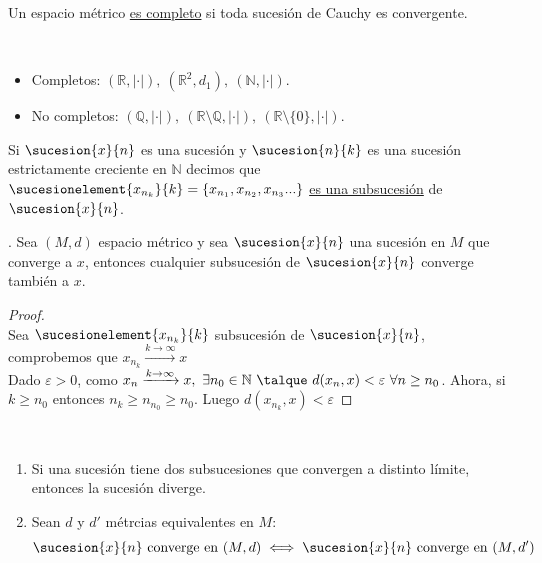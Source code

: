 	\begin{defi} Un espacio m\'etrico \underline{es completo} si toda sucesi\'on de Cauchy es convergente.
	\end{defi}   
	    
	\begin{ejem} \
	    \begin{itemize}
	    		\item Completos: $(\mathbb{R},|\cdot|),\ (\mathbb{R}^2,d_1),\ (\mathbb{N},|\cdot|)$.
	    		\item No completos: $(\mathbb{Q},|\cdot|), \ (\mathbb{R}\setminus\mathbb{Q},|\cdot|),\ (\mathbb{R}\setminus\{0\},|\cdot|)$.
	    \end{itemize}
	\end{ejem}
	    
	\begin{defi}Si $\sucesion{x}{n}$ es una sucesi\'on y $\sucesion{n}{k}$ es una sucesi\'on estrictamente creciente en $\mathbb{N}$ decimos que $\sucesionelement{x_{n_k}}{k}=\{x_{n_1},x_{n_2},x_{n_3}...\}$ \underline{ es una subsucesi\'on} de $\sucesion{x}{n}$.
	\end{defi}
	    
	\begin{proposicion}. Sea $(M,d)$ espacio m\'etrico y sea $\sucesion{x}{n}$ una sucesi\'on en $M$ que converge a $x$, entonces cualquier subsucesi\'on de $\sucesion{x}{n}$ converge tambi\'en a $x$.
		\begin{proof} \ \\
			Sea $\sucesionelement{x_{n_k}}{k}$ subsucesi\'on de $\sucesion{x}{n}$, comprobemos que $x_{n_k}\xrightarrow{k\rightarrow\infty}x$\\
	    Dado $\varepsilon>0$, como $x_n\xrightarrow{k\rightarrow\infty}x,\ \exists n_0\in \mathbb{N}\ \talque\ d(x_n,x)<\varepsilon\ \forall n\geq n_0$. Ahora, si $k\geq n_0$ entonces $n_k\geq n_{n_0}\geq n_0$. Luego $d(x_{n_k},x)<\varepsilon$
		\end{proof}
	\end{proposicion}
	
	\begin{corolario}\ 
	    \begin{enumerate}[1)]
	    		\item Si una sucesi\'on tiene dos subsucesiones que convergen a distinto l\'imite, entonces la sucesi\'on diverge.
	    		\item Sean $d$ y $d'$ m\'etrcias equivalentes en $M$:
	    		\[\sucesion{x}{n}\mathrm{\ converge\ en\ }(M,d)\iff \sucesion{x}{n}\mathrm{\ converge\ en\ }(M,d')\]
	    \end{enumerate}
	\end{corolario}
	    
